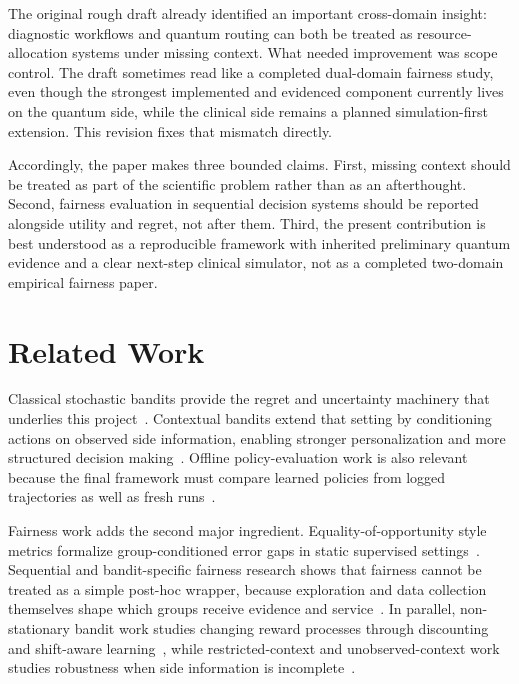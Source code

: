 \documentclass[conference]{IEEEtran}
\begin{document}
The original rough draft already identified an important cross-domain insight: diagnostic workflows and quantum routing can both be treated as resource-allocation systems under missing context. What needed improvement was scope control. The draft sometimes read like a completed dual-domain fairness study, even though the strongest implemented and evidenced component currently lives on the quantum side, while the clinical side remains a planned simulation-first extension. This revision fixes that mismatch directly.

Accordingly, the paper makes three bounded claims. First, missing context should be treated as part of the scientific problem rather than as an afterthought. Second, fairness evaluation in sequential decision systems should be reported alongside utility and regret, not after them. Third, the present contribution is best understood as a reproducible framework with inherited preliminary quantum evidence and a clear next-step clinical simulator, not as a completed two-domain empirical fairness paper.

\section{Related Work}
Classical stochastic bandits provide the regret and uncertainty machinery that underlies this project~\cite{auer2002finite,russo2018tutorial,lattimore2020bandit}. Contextual bandits extend that setting by conditioning actions on observed side information, enabling stronger personalization and more structured decision making~\cite{li2010contextual,abbasi2011linear,agarwal2014taming}. Offline policy-evaluation work is also relevant because the final framework must compare learned policies from logged trajectories as well as fresh runs~\cite{dudik2011doubly}.

Fairness work adds the second major ingredient. Equality-of-opportunity style metrics formalize group-conditioned error gaps in static supervised settings~\cite{hardt2016equality}. Sequential and bandit-specific fairness research shows that fairness cannot be treated as a simple post-hoc wrapper, because exploration and data collection themselves shape which groups receive evidence and service~\cite{joseph2016fairness,chen2020fair,metevier2019offline}. In parallel, non-stationary bandit work studies changing reward processes through discounting and shift-aware learning~\cite{garivier2008ucb,besbes2014stochastic}, while restricted-context and unobserved-context work studies robustness when side information is incomplete~\cite{bouneffouf2017context,park2022efficient}.
\end{document}
